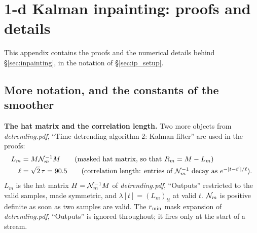 \documentclass{article}
\numberwithin{equation}{section}   %
\def\nn{\nonumber}
\newcommand{\dtnotes}[1]{{\em detrending.pdf}, ``#1''}
\begin{document}
\appendix

\section{1-d Kalman inpainting: proofs and details}
\label{app:ip}

This appendix contains the proofs and the numerical details behind \S\ref{sec:inpainting}, in the
notation of \S\ref{sec:ip_setup}.

\subsection{More notation, and the constants of the smoother}
\label{sec:ip_constants}

{\bf The hat matrix and the correlation length.}  Two more objects from \dtnotes{Time detrending
algorithm 2: Kalman filter} are used in the proofs:
\begin{align}
L_m &= M {\cal N}_m^{-1} M \qquad \mbox{(masked hat matrix, so that $R_m = M - L_m$)} \nn \\
\ell &= \sqrt2\,\tau = 90.5 \qquad \mbox{(correlation length: entries of ${\cal N}_m^{-1}$ decay as $e^{-|t-t'|/\ell}$)} .
\label{eq:ip_notation2}
\end{align}
$L_m$ is the hat matrix $H = {\cal N}_m^{-1}M$ of \dtnotes{Outputs} restricted to the valid samples, made
symmetric, and $\lambda[t] = (L_m)_{tt}$ at valid $t$.  ${\cal N}_m$ is positive definite as soon as two
samples are valid.  The $r_{\rm min}$ mask expansion of \dtnotes{Outputs} is ignored throughout; it fires
only at the start of a stream.
\end{document}
